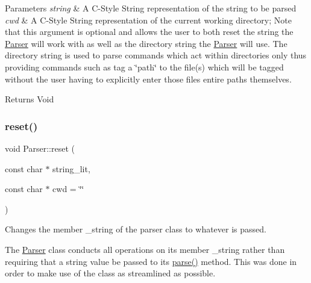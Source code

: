 \begin{DoxyParams}{Parameters}
{\em string} & A C-\/\+Style String representation of the string to be parsed\\
\hline
{\em cwd} & A C-\/\+Style String representation of the current working directory; Note that this argument is optional and allows the user to both reset the string the \mbox{\hyperlink{classParser}{Parser}} will work with as well as the directory string the \mbox{\hyperlink{classParser}{Parser}} will use. The directory string is used to parse commands which act within directories only thus providing commands such as \textquotesingle{}tag\textquotesingle{} a \char`\"{}path\char`\"{} to the file(s) which will be tagged without the user having to explicitly enter those file\textquotesingle{}s entire paths themselves.\\
\hline
\end{DoxyParams}
\begin{DoxyReturn}{Returns}
Void 
\end{DoxyReturn}
\mbox{\label{classParser_ab51b81b1617f1948205d73804e3c0fb9}} 
\subsubsection{\texorpdfstring{reset()}{reset()}\hspace{0.1cm}{\footnotesize\ttfamily [3/3]}}
{\footnotesize\ttfamily void Parser\+::reset (\begin{DoxyParamCaption}\item[{const char $\ast$}]{string\+\_\+lit,  }\item[{const char $\ast$}]{cwd = {\ttfamily \char`\"{}\char`\"{}} }\end{DoxyParamCaption})}



Changes the member \+\_\+string of the parser class to whatever is passed. 

The \mbox{\hyperlink{classParser}{Parser}} class conducts all operations on its member \+\_\+string rather than requiring that a string value be passed to its \mbox{\hyperlink{classParser_a5b531e9ed867eeb8ccb9cb088cf35c24}{parse()}} method. This was done in order to make use of the class as streamlined as possible.


